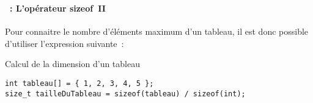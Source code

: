 \begin{frame}[containsverbatim]
  \frametitle{\secname}
  \framesubtitle{\subsecname~: L'opérateur sizeof~II}

  Pour connaitre le nombre d'éléments maximum d'un tableau, il est donc possible d'utiliser l'expression suivante~:
  \vspace{0.5cm}
  \begin{exampleblock}{Calcul de la dimension d'un tableau}
    \begin{verbatim}
int tableau[] = { 1, 2, 3, 4, 5 };
size_t tailleDuTableau = sizeof(tableau) / sizeof(int);\end{verbatim}
  \end{exampleblock}
\end{frame}

